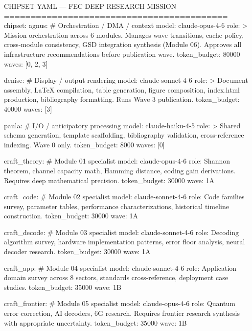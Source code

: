 \documentclass[11pt,letterpaper]{article}
\begin{document}
\begin{asciibox}
CHIPSET YAML --- FEC DEEP RESEARCH MISSION
==========================================
chipset:
  agnus:                           # Orchestration / DMA / context
    model: claude-opus-4-6
    role: >
      Mission orchestration across 6 modules.
      Manages wave transitions, cache policy,
      cross-module consistency, GSD integration
      synthesis (Module 06). Approves all
      infrastructure recommendations before
      publication wave.
    token_budget: 80000
    waves: [0, 2, 3]

  denise:                          # Display / output rendering
    model: claude-sonnet-4-6
    role: >
      Document assembly, LaTeX compilation,
      table generation, figure composition,
      index.html production, bibliography
      formatting. Runs Wave 3 publication.
    token_budget: 40000
    waves: [3]

  paula:                           # I/O / anticipatory processing
    model: claude-haiku-4-5
    role: >
      Shared schema generation, template
      scaffolding, bibliography validation,
      cross-reference indexing. Wave 0 only.
    token_budget: 8000
    waves: [0]

  craft_theory:                    # Module 01 specialist
    model: claude-opus-4-6
    role: Shannon theorem, channel capacity math,
          Hamming distance, coding gain derivations.
          Requires deep mathematical precision.
    token_budget: 30000
    wave: 1A

  craft_code:                      # Module 02 specialist
    model: claude-sonnet-4-6
    role: Code families survey, parameter tables,
          performance characterizations,
          historical timeline construction.
    token_budget: 30000
    wave: 1A

  craft_decode:                    # Module 03 specialist
    model: claude-sonnet-4-6
    role: Decoding algorithm survey, hardware
          implementation patterns, error floor
          analysis, neural decoder research.
    token_budget: 30000
    wave: 1A

  craft_app:                       # Module 04 specialist
    model: claude-sonnet-4-6
    role: Application domain survey across 8
          sectors, standards cross-reference,
          deployment case studies.
    token_budget: 35000
    wave: 1B

  craft_frontier:                  # Module 05 specialist
    model: claude-opus-4-6
    role: Quantum error correction, AI decoders,
          6G research. Requires frontier research
          synthesis with appropriate uncertainty.
    token_budget: 35000
    wave: 1B


\end{asciibox}
\end{document}
